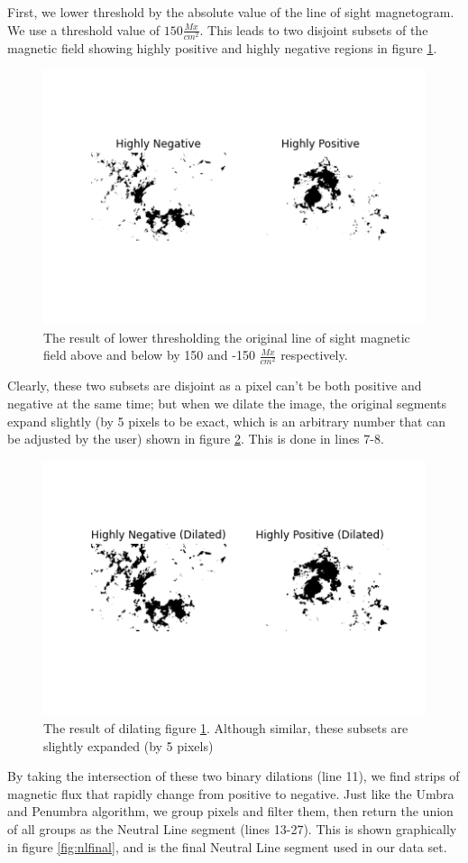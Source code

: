 First, we lower threshold by the absolute value of the line of sight magnetogram. We use a threshold value of $150 \frac{Mx}{cm^2}$. This leads to two disjoint subsets of the magnetic field showing highly positive and highly negative regions in figure \ref{fig:nlposneg}.


\begin{figure}[h]
    \centering
    \includegraphics[width=0.5\linewidth]{ThesisFilePkg/figures/data/posneg.png}
    \caption{The result of lower thresholding the original line of sight magnetic field above and below by 150 and -150 $\frac{Mx}{cm^2}$ respectively.}
    \label{fig:nlposneg}
\end{figure}

Clearly, these two subsets are disjoint as a pixel can't be both positive and negative at the same time; but when we dilate the image, the original segments expand slightly (by 5 pixels to be exact, which is an arbitrary number that can be adjusted by the user) shown in figure \ref{fig:nldilated}. This is done in lines 7-8.

\begin{figure}[h]
    \centering
    \includegraphics[width=0.5\linewidth]{ThesisFilePkg/figures/data/dilated.png}
    \caption{The result of dilating figure \ref{fig:nlposneg}. Although similar, these subsets are slightly expanded (by 5 pixels)}
    \label{fig:nldilated}
\end{figure}

By taking the intersection of these two binary dilations (line 11), we find strips of magnetic flux that rapidly change from positive to negative. Just like the Umbra and Penumbra algorithm, we group pixels and filter them, then return the union of all groups as the Neutral Line segment (lines 13-27). This is shown graphically in figure \ref{fig:nlfinal}, and is the final Neutral Line segment used in our data set.


